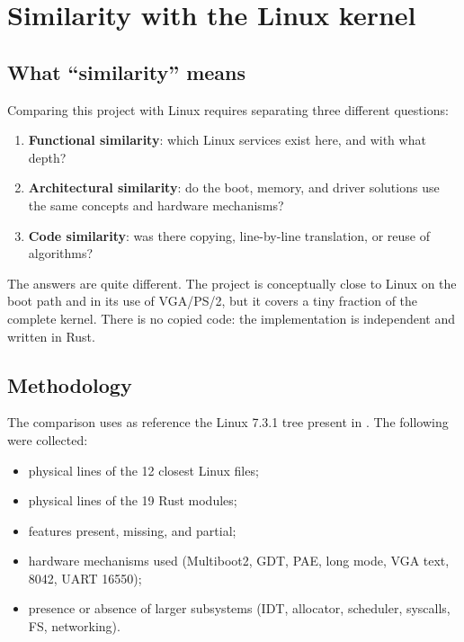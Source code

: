 \chapter{Similarity with the Linux kernel}
\label{cap:similaridade}

\section{What ``similarity'' means}

Comparing this project with Linux requires separating three different questions:

\begin{enumerate}
  \item \textbf{Functional similarity}: which Linux services exist
        here, and with what depth?
  \item \textbf{Architectural similarity}: do the boot, memory, and driver
        solutions use the same concepts and hardware mechanisms?
  \item \textbf{Code similarity}: was there copying, line-by-line
        translation, or reuse of algorithms?
\end{enumerate}

The answers are quite different. The project is conceptually close to Linux
on the boot path and in its use of VGA/PS/2, but it covers a tiny fraction of
the complete kernel. There is no copied code: the implementation is
independent and written in Rust.

\section{Methodology}

The comparison uses as reference the Linux 7.3.1 tree present in
. The following were collected:

\begin{itemize}
  \item physical lines of the 12 closest Linux files;
  \item physical lines of the 19 Rust modules;
  \item features present, missing, and partial;
  \item hardware mechanisms used (Multiboot2, GDT, PAE, long mode,
        VGA text, 8042, UART 16550);
  \item presence or absence of larger subsystems (IDT, allocator,
        scheduler, syscalls, FS, networking).
\end{itemize}

